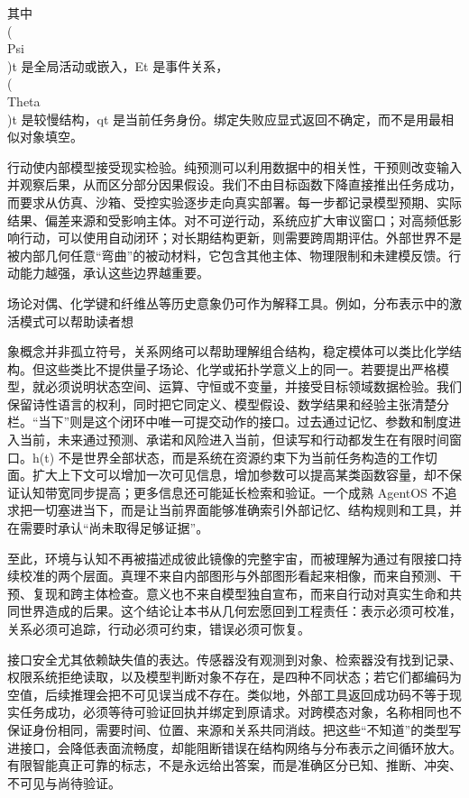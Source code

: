 其中 \\(\\Psi\\)t 是全局活动或嵌入，Et 是事件关系，\\(\\Theta\\)t 是较慢结构，qt 是当前任务身份。绑定失败应显式返回不确定，而不是用最相似对象填空。

行动使内部模型接受现实检验。纯预测可以利用数据中的相关性，干预则改变输入并观察后果，从而区分部分因果假设。我们不由目标函数下降直接推出任务成功，而要求从仿真、沙箱、受控实验逐步走向真实部署。每一步都记录模型预期、实际结果、偏差来源和受影响主体。对不可逆行动，系统应扩大审议窗口；对高频低影响行动，可以使用自动闭环；对长期结构更新，则需要跨周期评估。外部世界不是被内部几何任意“弯曲”的被动材料，它包含其他主体、物理限制和未建模反馈。行动能力越强，承认这些边界越重要。

场论对偶、化学键和纤维丛等历史意象仍可作为解释工具。例如，分布表示中的激活模式可以帮助读者想

象概念并非孤立符号，关系网络可以帮助理解组合结构，稳定模体可以类比化学结构。但这些类比不提供量子场论、化学或拓扑学意义上的同一。若要提出严格模型，就必须说明状态空间、运算、守恒或不变量，并接受目标领域数据检验。我们保留诗性语言的权利，同时把它同定义、模型假设、数学结果和经验主张清楚分栏。“当下”则是这个闭环中唯一可提交动作的接口。过去通过记忆、参数和制度进入当前，未来通过预测、承诺和风险进入当前，但读写和行动都发生在有限时间窗口。h(t) 不是世界全部状态，而是系统在资源约束下为当前任务构造的工作切面。扩大上下文可以增加一次可见信息，增加参数可以提高某类函数容量，却不保证认知带宽同步提高；更多信息还可能延长检索和验证。一个成熟 AgentOS 不追求把一切塞进当下，而是让当前界面能够准确索引外部记忆、结构规则和工具，并在需要时承认“尚未取得足够证据”。

至此，环境与认知不再被描述成彼此镜像的完整宇宙，而被理解为通过有限接口持续校准的两个层面。真理不来自内部图形与外部图形看起来相像，而来自预测、干预、复现和跨主体检查。意义也不来自模型独自宣布，而来自行动对真实生命和共同世界造成的后果。这个结论让本书从几何宏愿回到工程责任：表示必须可校准，关系必须可追踪，行动必须可约束，错误必须可恢复。

接口安全尤其依赖缺失值的表达。传感器没有观测到对象、检索器没有找到记录、权限系统拒绝读取，以及模型判断对象不存在，是四种不同状态；若它们都编码为空值，后续推理会把不可见误当成不存在。类似地，外部工具返回成功码不等于现实任务成功，必须等待可验证回执并绑定到原请求。对跨模态对象，名称相同也不保证身份相同，需要时间、位置、来源和关系共同消歧。把这些“不知道”的类型写进接口，会降低表面流畅度，却能阻断错误在结构网络与分布表示之间循环放大。有限智能真正可靠的标志，不是永远给出答案，而是准确区分已知、推断、冲突、不可见与尚待验证。

